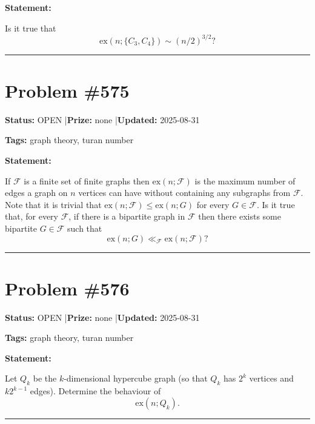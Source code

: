\documentclass{article}
\begin{document}
\medskip

\noindent\textbf{Statement:}

Is it true that\[\mathrm{ex}(n;\{C_3,C_4\})\sim (n/2)^{3/2}?\]

\noindent\rule{\linewidth}{0.4pt}


\section{Problem \#575}
\label{prob:575}

\noindent\textbf{Status:} OPEN \quad|\quad \textbf{Prize:} none \quad|\quad \textbf{Updated:} 2025-08-31

\noindent\textbf{Tags:} graph theory, turan number

\medskip

\noindent\textbf{Statement:}

If $\mathcal{F}$ is a finite set of finite graphs then $\mathrm{ex}(n;\mathcal{F})$ is the maximum number of edges a graph on $n$ vertices can have without containing any subgraphs from $\mathcal{F}$. Note that it is trivial that $\mathrm{ex}(n;\mathcal{F})\leq \mathrm{ex}(n;G)$ for every $G\in\mathcal{F}$. Is it true that, for every $\mathcal{F}$, if there is a bipartite graph in $\mathcal{F}$ then there exists some bipartite $G\in\mathcal{F}$ such that\[\mathrm{ex}(n;G)\ll_{\mathcal{F}}\mathrm{ex}(n;\mathcal{F})?\]

\noindent\rule{\linewidth}{0.4pt}


\section{Problem \#576}
\label{prob:576}

\noindent\textbf{Status:} OPEN \quad|\quad \textbf{Prize:} none \quad|\quad \textbf{Updated:} 2025-08-31

\noindent\textbf{Tags:} graph theory, turan number

\medskip

\noindent\textbf{Statement:}

Let $Q_k$ be the $k$-dimensional hypercube graph (so that $Q_k$ has $2^k$ vertices and $k2^{k-1}$ edges). Determine the behaviour of\[\mathrm{ex}(n;Q_k).\]

\noindent\rule{\linewidth}{0.4pt}


\end{document}

